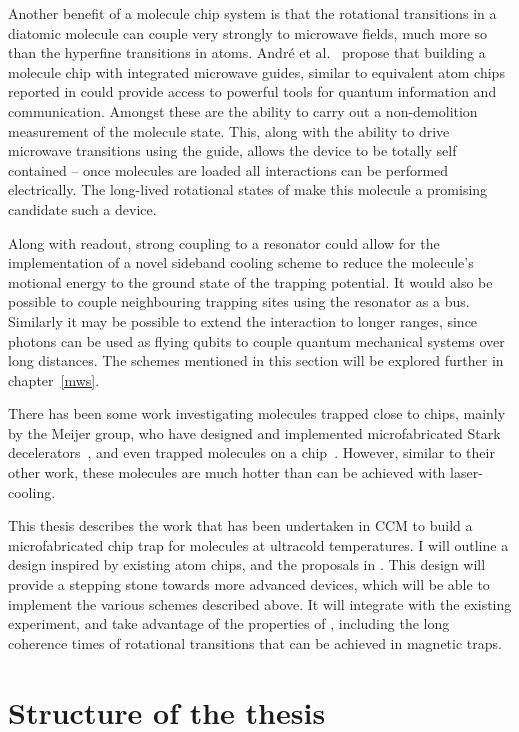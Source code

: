 Another benefit of a molecule chip system is that the rotational transitions in
a diatomic molecule can couple very strongly to microwave fields, much more so
than the hyperfine transitions in atoms. Andr\'e et al.~\cite{Andre2006}
propose that building a molecule chip with integrated microwave guides, similar
to equivalent atom chips reported in  could provide
access to powerful tools for quantum information and communication. Amongst
these are the ability to carry out a non-demolition measurement of the molecule
state. This, along with the ability to drive microwave transitions using the
guide, allows the device to be totally self contained -- once molecules
are loaded all interactions can be performed electrically. The long-lived
rotational states of \CaF{} make this molecule a promising candidate such a
device.

Along with readout, strong coupling to a resonator could allow for the
implementation of a novel sideband cooling scheme to reduce the molecule's
motional energy to the ground state of the trapping potential. It would also be
possible to couple neighbouring trapping sites using the resonator as a bus.
Similarly it may be possible to extend the interaction to longer ranges, since
photons can be used as flying qubits to couple quantum mechanical systems over
long distances. The schemes mentioned in this section will be explored further
in chapter~\ref{mws}.

There has been some work investigating molecules trapped close to chips, mainly by
the Meijer group, who have designed and implemented microfabricated Stark
decelerators~\cite{Meek2008}, and even trapped molecules on a
chip~\cite{Meek2009}. However, similar to their other work, these molecules are
much hotter than can be achieved with laser-cooling.

This thesis describes the work that has been undertaken in CCM to build a
microfabricated chip trap for \CaF{} molecules at ultracold temperatures. I
will outline a design inspired by existing atom chips, and the proposals in
. This design will provide a stepping stone towards more
advanced devices, which will be able to implement the various schemes described
above. It will integrate with the existing experiment, and take advantage of
the properties of \CaF{}, including the long coherence times of rotational
transitions that can be achieved in magnetic traps.

\section{Structure of the thesis}


